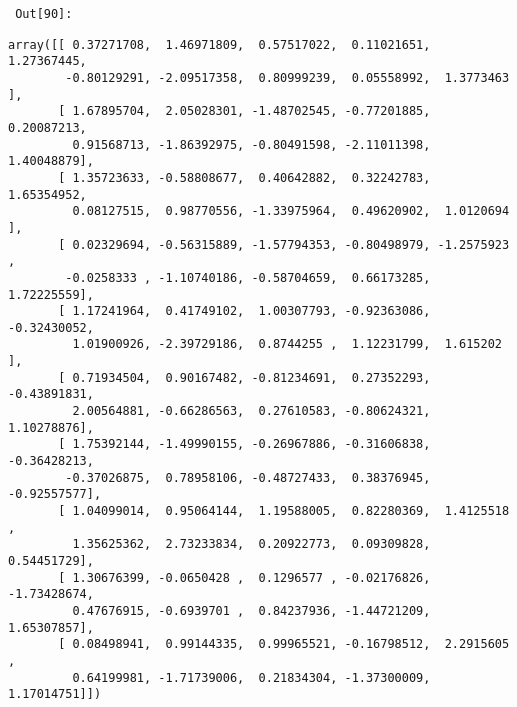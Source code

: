         {\par%
        \vspace{-1\smallerfontscale}%
        \noindent%
        \begin{minipage}{\cellleftmargin}%
    \hfill%
    {\smaller%
    \tt%
    \color{nbframe-out-prompt}%
    Out[90]:}%
    \hspace{\inputpadding}%
    \hspace{0em}%
    \hspace{3pt}%
    \end{minipage}%
        }%
    \begin{addmargin}[\cellleftmargin]{0em}%
    {\smaller%
    \vspace{-1\smallerfontscale}%
    
    
    
    \begin{verbatim}
array([[ 0.37271708,  1.46971809,  0.57517022,  0.11021651,  1.27367445,
        -0.80129291, -2.09517358,  0.80999239,  0.05558992,  1.3773463 ],
       [ 1.67895704,  2.05028301, -1.48702545, -0.77201885,  0.20087213,
         0.91568713, -1.86392975, -0.80491598, -2.11011398,  1.40048879],
       [ 1.35723633, -0.58808677,  0.40642882,  0.32242783,  1.65354952,
         0.08127515,  0.98770556, -1.33975964,  0.49620902,  1.0120694 ],
       [ 0.02329694, -0.56315889, -1.57794353, -0.80498979, -1.2575923 ,
        -0.0258333 , -1.10740186, -0.58704659,  0.66173285,  1.72225559],
       [ 1.17241964,  0.41749102,  1.00307793, -0.92363086, -0.32430052,
         1.01900926, -2.39729186,  0.8744255 ,  1.12231799,  1.615202  ],
       [ 0.71934504,  0.90167482, -0.81234691,  0.27352293, -0.43891831,
         2.00564881, -0.66286563,  0.27610583, -0.80624321,  1.10278876],
       [ 1.75392144, -1.49990155, -0.26967886, -0.31606838, -0.36428213,
        -0.37026875,  0.78958106, -0.48727433,  0.38376945, -0.92557577],
       [ 1.04099014,  0.95064144,  1.19588005,  0.82280369,  1.4125518 ,
         1.35625362,  2.73233834,  0.20922773,  0.09309828,  0.54451729],
       [ 1.30676399, -0.0650428 ,  0.1296577 , -0.02176826, -1.73428674,
         0.47676915, -0.6939701 ,  0.84237936, -1.44721209,  1.65307857],
       [ 0.08498941,  0.99144335,  0.99965521, -0.16798512,  2.2915605 ,
         0.64199981, -1.71739006,  0.21834304, -1.37300009,  1.17014751]])
    \end{verbatim}

    
}%
    \end{addmargin}%

